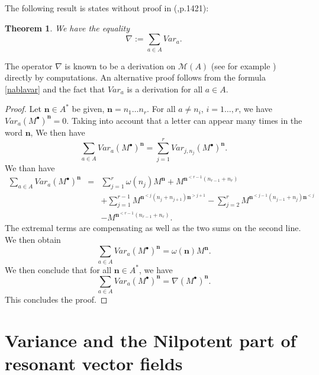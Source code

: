 \documentclass[english,11pt]{amsart}
\newtheorem{theorem}{Theorem}
\def\nn{\mathbf{n}}
\def\M{\mathscr{M}}
\def\di{\displaystyle}
\def\nn{\mathbf{n}}
\begin{document}
The following result is states without proof in (\cite{es},p.1421):

\begin{theorem}
\label{nablavart}
We have the equality
\begin{equation}
\label{nablavar}
    \nabla :=\di\sum_{a \in A} Var_{a} .
\end{equation}
\end{theorem}

The operator $\nabla$ is known to be a derivation on $\M (A)$ (see for example \cite{cr2}) directly by computations. An alternative proof follows from the formula \eqref{nablavar} and the fact that $Var_a$ is a derivation for all $a\in A$. 

\begin{proof}
Let $\nn \in A^*$ be given, $\nn =n_1 \dots n_r$. For all $a\not= n_i$, $i=1\dots ,r$, we have $Var_a (M^{\bullet} )^{\nn} =0$. Taking into account that a letter can appear many times in the word $\nn$, We then have 
\begin{equation}
    \di\sum_{a\in A} Var_a (M^{\bullet} )^{\nn} =\di\sum_{j=1}^r Var_{j, n_j} (M^{\bullet} )^{\nn} .
\end{equation}
We than have 
\begin{equation}
\left .
\begin{array}{lll}
    \di\sum_{a\in A} Var_a (M^{\bullet} )^{\nn} & = &  
    \di\sum_{j=1}^r \omega (n_j ) M^{\nn} + M^{\nn^{<r-1} (n_{r-1} +n_r)}\\ 
& &     +\di\sum_{j=1}^{r-1} M^{\nn^{<j} (n_j +n_{j+1} ) \nn^{>j+1}} -
    \di\sum_{j=2}^{r} M^{\nn^{<j-1} (n_{j-1} +n_j ) \nn^{<j}}\\
& &    - M^{\nn^{<r-1} (n_{r-1}+n_r)}.
\end{array}
\right .
\end{equation}
The extremal terms are compensating as well as the two sums on the second line. We then obtain 
\begin{equation}
\di\sum_{a\in A} Var_a (M^{\bullet} )^{\nn}     =  \omega (\nn ) M^{\nn} .
\end{equation}
We then conclude that for all $\nn \in A^*$, we have 
\begin{equation}
\di\sum_{a\in A} Var_a (M^{\bullet} )^{\nn} =\nabla (M^{\bullet} )^{\nn} .    
\end{equation}
This concludes the proof.
\end{proof}

\section{Variance and the Nilpotent part of resonant vector fields}
\label{varnilpo}
\end{document}
